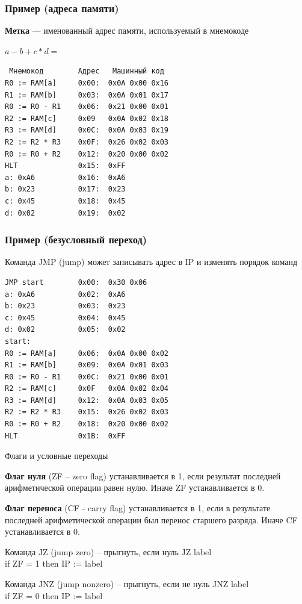 \documentclass{beamer}
\begin{document}
    \begin{frame}[fragile]
        \frametitle{Пример (адреса памяти)}
        {\bf Метка} --- именованный адрес памяти, используемый в мнемокоде
        \begin{block}{$a - b + c*d = $}
        \begin{verbatim}
 Мнемокод        Адрес   Машинный код
R0 := RAM[a]     0x00:  0x0A 0x00 0x16
R1 := RAM[b]     0x03:  0x0A 0x01 0x17
R0 := R0 - R1    0x06:  0x21 0x00 0x01
R2 := RAM[c]     0x09   0x0A 0x02 0x18
R3 := RAM[d]     0x0C:  0x0A 0x03 0x19
R2 := R2 * R3    0x0F:  0x26 0x02 0x03
R0 := R0 + R2    0x12:  0x20 0x00 0x02
HLT              0x15:  0xFF
a: 0xA6          0x16:  0xA6
b: 0x23          0x17:  0x23
c: 0x45          0x18:  0x45
d: 0x02          0x19:  0x02
        \end{verbatim}
        \end{block}
\end{frame}
    \begin{frame}[fragile]
        \frametitle{Пример (безусловный переход)}
        Команда JMP (jump) может записывать адрес в IP и изменять порядок команд
        \begin{block}{}
        \begin{verbatim}
JMP start        0x00:  0x30 0x06
a: 0xA6          0x02:  0xA6
b: 0x23          0x03:  0x23
c: 0x45          0x04:  0x45
d: 0x02          0x05:  0x02
start:
R0 := RAM[a]     0x06:  0x0A 0x00 0x02
R1 := RAM[b]     0x09:  0x0A 0x01 0x03
R0 := R0 - R1    0x0C:  0x21 0x00 0x01
R2 := RAM[c]     0x0F   0x0A 0x02 0x04
R3 := RAM[d]     0x12:  0x0A 0x03 0x05
R2 := R2 * R3    0x15:  0x26 0x02 0x03
R0 := R0 + R2    0x18:  0x20 0x00 0x02
HLT              0x1B:  0xFF
        \end{verbatim}
        \end{block}
\end{frame}
    \begin{frame}{Флаги и условные переходы}

    {\bf Флаг нуля} (ZF -- zero flag) устанавливается в 1, если результат последней арифметической операции равен нулю. Иначе ZF устанавливается в 0. 

    {\bf Флаг переноса} (CF - carry flag) устанавливается в 1, если в результате последней арифметической операции был перенос старшего разряда. Иначе CF устанавливается в 0.
    \begin{block}{Команда JZ (jump zero) --  прыгнуть, если нуль}
        JZ label \\
        if ZF = 1 then
            IP := label
    \end{block}
    \begin{block}{Команда JNZ (jump nonzero) --  прыгнуть, если не нуль}
    JNZ label \\
    if ZF = 0 then
        IP := label
    \end{block}
    \end{frame}
\end{document}
